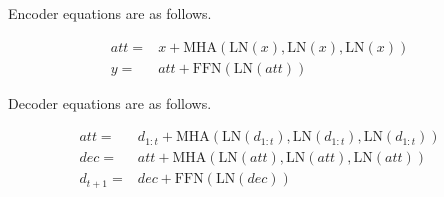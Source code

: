 Encoder equations are as follows.

\begin{equation}
\begin{split}
att = & x+ \mathrm{MHA}(\mathrm{LN}(x),\mathrm{LN}(x),\mathrm{LN}(x)) \\
y = & att+ \mathrm{FFN}(\mathrm{LN}(att))
\end{split}
\end{equation}

Decoder equations are as follows.

\begin{equation}
\begin{split}
att = & d_{1:t}+\mathrm{MHA}(\mathrm{LN}(d_{1:t}),\mathrm{LN}(d_{1:t}),\mathrm{LN}(d_{1:t})) \\
dec = & att+ \mathrm{MHA}(\mathrm{LN}(att),\mathrm{LN}(att),\mathrm{LN}(att)) \\
d_{t+1} = & dec+ \mathrm{FFN}(\mathrm{LN}(dec))
\end{split}
\end{equation}

